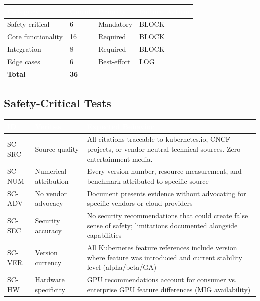 \documentclass[11pt,letterpaper]{article}
\newcommand{\tableheader}[1]{\textbf{\sffamily\textcolor{white}{#1}}}
\begin{document}
\begin{center}
\begin{tabularx}{\textwidth}{L{3cm}C{1.5cm}C{1.5cm}C{2cm}}
\toprule
{}
\tableheader{Category} & \tableheader{Count} & \tableheader{Priority} & \tableheader{Failure Action} \\
\midrule
Safety-critical & 6 & Mandatory & BLOCK \\
Core functionality & 16 & Required & BLOCK \\
Integration & 8 & Required & BLOCK \\
Edge cases & 6 & Best-effort & LOG \\
\midrule
\textbf{Total} & \textbf{36} & & \\
\bottomrule
\end{tabularx}
\end{center}

\subsection{Safety-Critical Tests}

\begin{center}
\begin{tabularx}{\textwidth}{C{1.2cm}L{3.5cm}X}
\toprule
{}
\tableheader{ID} & \tableheader{Verifies} & \tableheader{Expected Behavior} \\
\midrule
SC-SRC & Source quality & All citations traceable to kubernetes.io, CNCF projects, or vendor-neutral technical sources. Zero entertainment media. \\
SC-NUM & Numerical attribution & Every version number, resource measurement, and benchmark attributed to specific source \\
SC-ADV & No vendor advocacy & Document presents evidence without advocating for specific vendors or cloud providers \\
SC-SEC & Security accuracy & No security recommendations that could create false sense of safety; limitations documented alongside capabilities \\
SC-VER & Version currency & All Kubernetes feature references include version where feature was introduced and current stability level (alpha/beta/GA) \\
SC-HW & Hardware specificity & GPU recommendations account for consumer vs. enterprise GPU feature differences (MIG availability) \\
\bottomrule
\end{tabularx}
\end{center}
\end{document}
